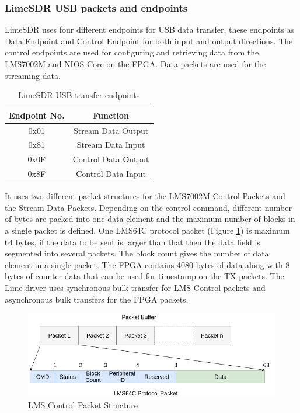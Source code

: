 \subsubsection{LimeSDR USB packets and endpoints}
LimeSDR uses four different endpoints for USB data transfer, these endpoints as Data Endpoint and Control Endpoint for both input and output directions. The control endpoints are used for configuring and retrieving data from the LMS7002M and NIOS Core on the FPGA. Data packets are used for the streaming data. 
\begin{table}[h!]
\centering
\begin{tabular}{|c|c|}
\hline
Endpoint No. & Function\\
\hline
0x01 & Stream Data Output\\
0x81 & Stream Data Input\\
0x0F & Control Data Output\\
0x8F & Control Data Input\\
\hline
\end{tabular}
\caption{LimeSDR USB transfer endpoints}
\end{table}
It uses two different packet structures for the LMS7002M Control Packets and the Stream Data Packets. Depending on the control command, different number of bytes are packed into one data element and the maximum number of blocks in a single packet is defined. One LMS64C protocol packet (Figure \ref{lms_packet}) is maximum 64 bytes, if the data to be sent is larger than that then the data field is segmented into several packets. The block count gives the number of data element in a single packet. The FPGA contains 4080 bytes of data along with 8 bytes of counter data that can be used for timestamp on the TX packets. The Lime driver uses synchronous bulk transfer for LMS Control packets and asynchronous bulk transfers for the FPGA packets.
\begin{figure}[h!]
\centering
\includegraphics[width=\textwidth]{Figure/LMS64C_Packet.png}
\caption{LMS Control Packet Structure}
\label{lms_packet}
\end{figure}

